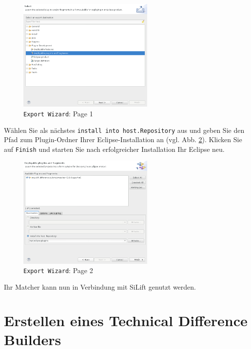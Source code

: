 \documentclass[a4paper]{scrartcl}
\begin{document}
\begin{figure}[H]
\centering
\includegraphics[width=0.6\textwidth]{graphics/silift-plugin_wizard_deploy01.png}
\caption{\texttt{Export Wizard}: Page 1}
\label{silift-plugin_wizard_deploy01}
\end{figure}

Wählen Sie als nächstes \texttt{install into host.Repository} aus und geben Sie den Pfad zum Plugin-Ordner Ihrer Eclipse-Installation an (vgl. Abb. \ref{silift-plugin_wizard_deploy02}).
Klicken Sie auf \texttt{Finish} und starten Sie nach erfolgreicher Installation Ihr Eclipse neu.

\begin{figure}[H]
\centering
\includegraphics[width=0.6\textwidth]{graphics/silift-plugin_wizard_deploy02.png}
\caption{\texttt{Export Wizard}: Page 2}
\label{silift-plugin_wizard_deploy02}
\end{figure}

Ihr Matcher kann nun in Verbindung mit SiLift genutzt werden.

\section{Erstellen eines Technical Difference Builders}\label{sec:TechnicalDifferenceBuilder}
\end{document}
